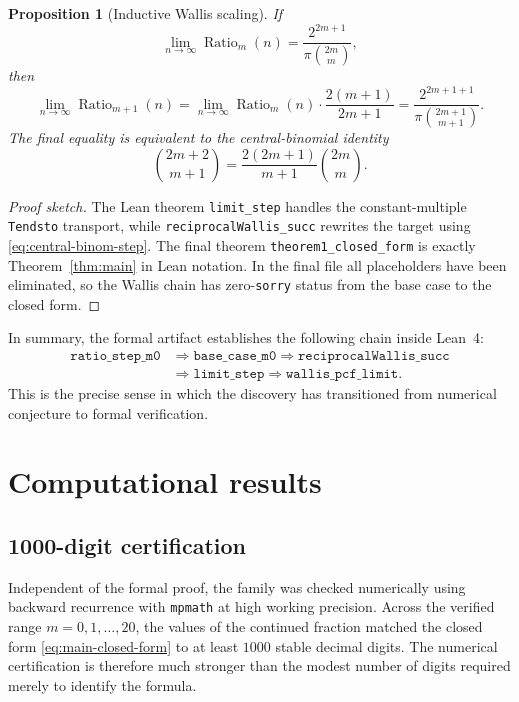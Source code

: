\documentclass[11pt,reqno]{amsart}
\newcommand{\WallisValue}[1]{\frac{2^{2#1+1}}{\pi\binom{2#1}{#1}}}
\newcommand{\WallisStep}[1]{\frac{2(#1+1)}{2#1+1}}
\theoremstyle{plain}
\newtheorem{proposition}[theorem]{Proposition}
\theoremstyle{definition}
\theoremstyle{remark}
\begin{document}
\begin{proposition}[Inductive Wallis scaling]\label{prop:limit-step}
If
\[
  \lim_{n\to\infty} \operatorname{Ratio}_m(n) = \WallisValue{m},
\]
then
\[
  \lim_{n\to\infty} \operatorname{Ratio}_{m+1}(n)
  = \lim_{n\to\infty} \operatorname{Ratio}_m(n)\cdot \WallisStep{m}
  = \WallisValue{m+1}.
\]
The final equality is equivalent to the central-binomial identity
\begin{equation}\label{eq:central-binom-step}
  \binom{2m+2}{m+1} = \frac{2(2m+1)}{m+1}\binom{2m}{m}.
\end{equation}
\end{proposition}

\begin{proof}[Proof sketch]
The Lean theorem \texttt{limit\_step} handles the constant-multiple \texttt{Tendsto} transport, while \texttt{reciprocalWallis\_succ} rewrites the target using \eqref{eq:central-binom-step}.  The final theorem \texttt{theorem1\_closed\_form} is exactly Theorem~\ref{thm:main} in Lean notation.  In the final file all placeholders have been eliminated, so the Wallis chain has zero-\texttt{sorry} status from the base case to the closed form.
\end{proof}

In summary, the formal artifact establishes the following chain inside Lean~4:
\[
\begin{aligned}
  \texttt{ratio\_step\_m0} &\Longrightarrow \texttt{base\_case\_m0}
    \Longrightarrow \texttt{reciprocalWallis\_succ} \\
  &\Longrightarrow \texttt{limit\_step}
    \Longrightarrow \texttt{wallis\_pcf\_limit}.
\end{aligned}
\]
This is the precise sense in which the discovery has transitioned from numerical conjecture to formal verification.

\section{Computational results}\label{sec:computational}

\subsection{1000-digit certification}

Independent of the formal proof, the family was checked numerically using backward recurrence with \texttt{mpmath} at high working precision.  Across the verified range $m=0,1,\dots,20$, the values of the continued fraction matched the closed form \eqref{eq:main-closed-form} to at least $1000$ stable decimal digits.  The numerical certification is therefore much stronger than the modest number of digits required merely to identify the formula.
\end{document}
